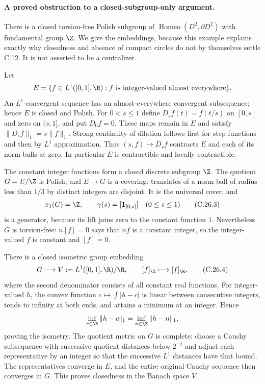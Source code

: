\paragraph{A proved obstruction to a closed-subgroup-only argument.}
There is a closed torsion-free Polish subgroup of
$\operatorname{Homeo}(D^2,\partial D^2)$ with fundamental group
$\Z$. We give the embeddings, because this example explains exactly
why closedness and absence of compact circles do not by themselves
settle C.12. It is not asserted to be a centralizer.

Let
\[
 E=\{f\in L^1([0,1],\R):f\text{ is integer-valued almost everywhere}\}.
\]
An $L^1$-convergent sequence has an almost-everywhere convergent
subsequence; hence $E$ is closed and Polish. For $0<s\leq1$ define
$D_sf(t)=f(t/s)$ on $[0,s]$ and zero on $(s,1]$, and put $D_0f=0$.
These maps remain in $E$ and satisfy $\|D_sf\|_1=s\|f\|_1$.
Strong continuity of dilation follows first for step functions and
then by $L^1$ approximation. Thus $(s,f)\mapsto D_sf$ contracts $E$
and each of its norm balls at zero. In particular $E$ is contractible
and locally contractible.

The constant integer functions form a closed discrete subgroup $\Z$.
The quotient $G=E/\Z$ is Polish, and $E\to G$ is a covering: translates
of a norm ball of radius less than $1/3$ by distinct integers are
disjoint. It is the universal cover, and
\[
 \pi_1(G)=\Z,\qquad
 \gamma(s)=[\mathbf1_{[0,s]}]\quad(0\leq s\leq1)          \tag{C.26.3}
\]
is a generator, because its lift joins zero to the constant function
$1$. Nevertheless $G$ is torsion-free: $n[f]=0$ says that $nf$ is
a constant integer, so the integer-valued $f$ is constant and $[f]=0$.

There is a closed isometric group embedding
\[
 G\longrightarrow V:=L^1([0,1],\R)/\R,
       \qquad[f]_{\Z}\longmapsto[f]_{\R},                 \tag{C.26.4}
\]
where the second denominator consists of all constant real functions.
For integer-valued $h$, the convex function $c\mapsto\int|h-c|$ is
linear between consecutive integers, tends to infinity at both ends,
and attains a minimum at an integer. Hence
\[
 \inf_{c\in\R}\|h-c\|_1=\inf_{n\in\Z}\|h-n\|_1,
\]
proving the isometry. The quotient metric on $G$ is complete: choose
a Cauchy subsequence with successive quotient distances below $2^{-j}$
and adjust each representative by an integer so that the successive
$L^1$ distances have that bound. The representatives converge in $E$,
and the entire original Cauchy sequence then converges in $G$.
This proves closedness in the Banach space $V$.

